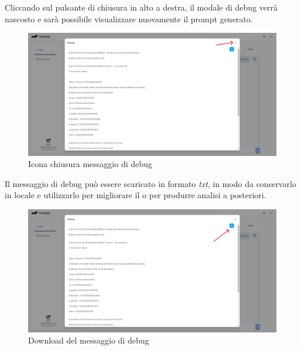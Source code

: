 \par Cliccando sul pulsante di chiusura in alto a destra, il modale di debug verrà nascosto e sarà possibile visualizzare nuovamente il prompt generato.
\begin{figure}[H]
  \centering
  \includegraphics[width=\textwidth]{assets/tasto_close_debug.png}
  \caption{Icona chiusura messaggio di debug}
\end{figure}


\par Il messaggio di debug può essere scaricato in formato \textit{txt}, in modo da conservarlo in locale e utilizzarlo per migliorare il  o per produrre analisi a posteriori.
\begin{figure}[H]
  \centering
  \includegraphics[width=\textwidth]{assets/tasto_download_debug.png}
  \caption{Download del messaggio di debug}
\end{figure}





